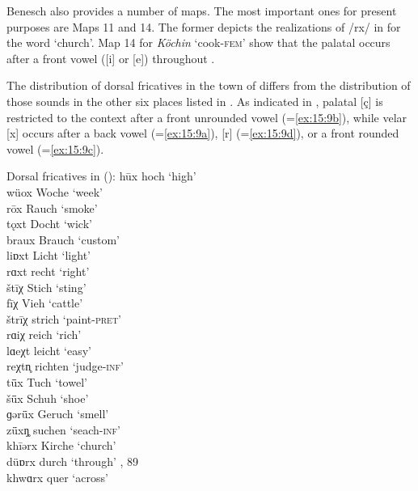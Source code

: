 {Benesch also provides a number of maps. The most important ones for present purposes are Maps 11 and 14. The former depicts the realizations of /rx/ in  for the word ‘church’. Map 14 for \textit{Köchin} ‘cook-\textsc{fem}’ show that the palatal occurs after a front vowel ([i] or [e]) throughout .

The distribution of dorsal fricatives in the town of  \citep{Benesch1979} differs from the distribution of those sounds in the other six places listed in . As indicated in , palatal [ç] is restricted to the context after a front unrounded vowel (=\ref{ex:15:9b}), while velar [x] occurs after a back vowel (=\ref{ex:15:9a}), [r] (=\ref{ex:15:9d}), or a front rounded vowel (=\ref{ex:15:9c}).

\ea%
\label{ex:15:9}Dorsal fricatives in  ():
\ea\label{ex:15:9a} hūx \tab  [huːx] \tab hoch  \tab  ‘high’ \\
wüox \tab  [wyox] \tab Woche  \tab  ‘week’ \\
rōx  \tab   [roːx] \tab Rauch  \tab  ‘smoke’ \\
tǫxt \tab  [tɔxt] \tab Docht  \tab  ‘wick’ \\
braux \tab  [braux] \tab Brauch  \tab  ‘custom’ \\
liɒxt \tab  [liɒxt] \tab Licht  \tab  ‘light’ \\
rɑxt \tab  [rɑxt] \tab recht  \tab  ‘right’ \\
\ex\label{ex:15:9b} štīχ \tab  [ʃtiːç] \tab Stich  \tab  ‘sting’ \\
fīχ  \tab   [fiːç] \tab Vieh  \tab  ‘cattle’ \\
štrīχ \tab [ʃtriːç] \tab strich  \tab  ‘paint-\textsc{pret}’ \\
rɑiχ \tab  [rɑiç] \tab reich  \tab  ‘rich’ \\
lɑeχt \tab [lɑeçt] \tab leicht  \tab  ‘easy’ \\
reχtn̥ \tab  [reçtn̩] \tab richten  \tab  ‘judge\textsc{{}-inf}’ \\
\ex\label{ex:15:9c} t\={ü}x  \tab   [tyːx] \tab Tuch  \tab  ‘towel’ \\
š\={ü}x \tab  [ʃyːx] \tab Schuh  \tab  ‘shoe’ \\
ɡər\={ü}x \tab  [gəryːx] \tab Geruch  \tab  ‘smell’ \\
z\={ü}xŋ̥ \tab  [zyːxŋ̍] \tab suchen  \tab  ‘seach-\textsc{inf}’ \\
\ex\label{ex:15:9d} khīərx \tab  [kʰiːərx] \tab Kirche  \tab  ‘church’ \\
düɒrx \tab [dyɒrx] \tab durch  \tab  ‘through’ , 89\\
khwɑrx \tab [kʰwɑrx] \tab quer  \tab  ‘across’ 
    \z
\z 

}
